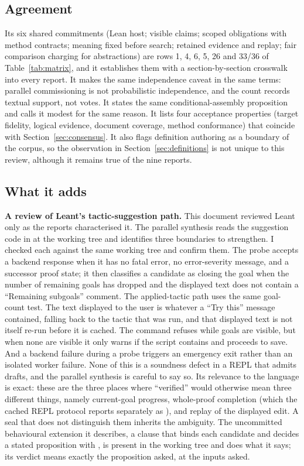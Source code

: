 \documentclass[11pt,a4paper]{article}
\newcommand{\code}[1]{\texttt{\detokenize{#1}}}
\theoremstyle{definition}
\begin{document}
\subsection{Agreement}
Its six shared commitments (Lean host; visible claims; scoped obligations with method contracts; meaning fixed before search; retained evidence and replay; fair comparison charging for abstractions) are rows 1, 4, 6, 5, 26 and 33/36 of Table~\ref{tab:matrix}, and it establishes them with a section-by-section crosswalk into every report. It makes the same independence caveat in the same terms: parallel commissioning is not probabilistic independence, and the count records textual support, not votes. It states the same conditional-assembly proposition and calls it modest for the same reason. It lists four acceptance properties (target fidelity, logical evidence, document coverage, method conformance) that coincide with Section~\ref{sec:consensus}. It also flags definition authoring as a boundary of the corpus, so the observation in Section~\ref{sec:definitions} is not unique to this review, although it remains true of the nine reports.

\subsection{What it adds}
\textbf{A review of Leant's tactic-suggestion path.} This document reviewed Leant only as the reports characterised it. The parallel synthesis reads the suggestion code in \code{src/Main.hs} at the working tree and identifies three boundaries to strengthen. I checked each against the same working tree and confirm them. The probe accepts a backend response when it has no fatal error, no error-severity message, and a successor proof state; it then classifies a candidate as closing the goal when the number of remaining goals has dropped and the displayed text does not contain a ``Remaining subgoals'' comment. The applied-tactic path uses the same goal-count test. The text displayed to the user is whatever a ``Try this'' message contained, falling back to the tactic that was run, and that displayed text is not itself re-run before it is cached. The \code{:qed} command refuses while goals are visible, but when none are visible it only warns if the script contains \code{sorry} and proceeds to save. And a backend failure during a probe triggers an emergency exit rather than an isolated worker failure. None of this is a soundness defect in a REPL that admits drafts, and the parallel synthesis is careful to say so. Its relevance to the language is exact: these are the three places where ``verified'' would otherwise mean three different things, namely current-goal progress, whole-proof completion (which the cached REPL protocol reports separately as \code{proofStatus}), and replay of the displayed edit. A seal that does not distinguish them inherits the ambiguity. The uncommitted behavioural extension it describes, a \code{where} clause that binds each candidate and decides a stated proposition with \code{decide}, is present in the working tree and does what it says; its verdict means exactly the proposition asked, at the inputs asked.
\end{document}
